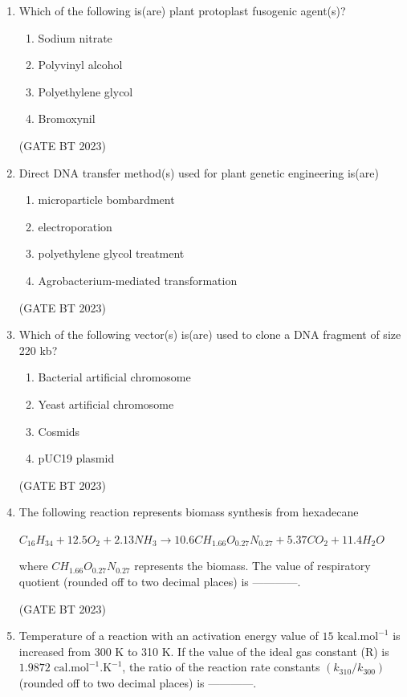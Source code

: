 \documentclass[journal,12pt,onecolumn]{IEEEtran}
\begin{document}
\begin{enumerate}
    \item Which of the following is(are) plant protoplast fusogenic agent(s)?
    \begin{enumerate}
        \item Sodium nitrate
        \item Polyvinyl alcohol
        \item Polyethylene glycol
        \item Bromoxynil
    \end{enumerate}
    \hfill(GATE BT 2023)

    \item Direct DNA transfer method(s) used for plant genetic engineering is(are)
    \begin{enumerate}
        \item microparticle bombardment
        \item electroporation
        \item polyethylene glycol treatment
        \item Agrobacterium-mediated transformation
    \end{enumerate}
    
    \hfill(GATE BT 2023)

    \item Which of the following vector(s) is(are) used to clone a DNA fragment of size 220 kb?
    \begin{enumerate}
        \item Bacterial artificial chromosome
        \item Yeast artificial chromosome
        \item Cosmids
        \item pUC19 plasmid
    \end{enumerate}\hfill(GATE BT 2023)

    \item The following reaction represents biomass synthesis from hexadecane 
    
    $C_{16}H_{34} + 12.5O_2 + 2.13NH_3 \rightarrow 10.6CH_{1.66}O_{0.27}N_{0.27} + 5.37CO_2 + 11.4H_2O$
    
    where $CH_{1.66}O_{0.27}N_{0.27}$ represents the biomass. The value of respiratory quotient (rounded off to two decimal places) is ------------.

    \hfill(GATE BT 2023)

    \item Temperature of a reaction with an activation energy value of $15 \text{ kcal.mol}^{-1}$ is increased from 300 K to 310 K. If the value of the ideal gas constant (R) is $1.9872 \text{ cal.mol}^{-1}.\text{K}^{-1}$, the ratio of the reaction rate constants $(k_{310}/k_{300})$ (rounded off to two decimal places) is ------------.


\end{enumerate}
\end{document}
